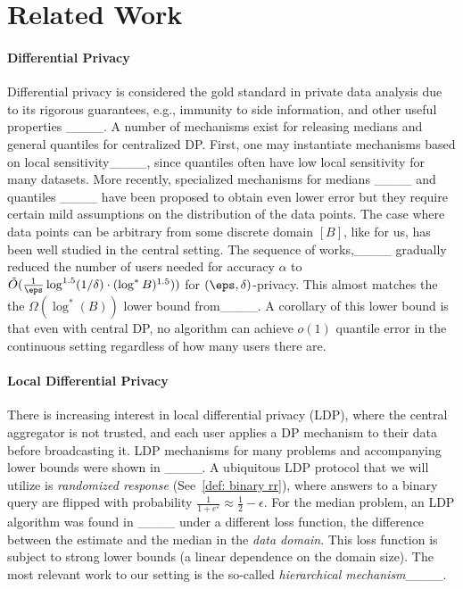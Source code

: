 \section{Related Work}
\label{sec:prior-work}

\paragraph{Differential Privacy} Differential privacy is considered the gold standard in private data analysis due to its rigorous guarantees, e.g., immunity to side information, and other useful properties ____. 
A number of mechanisms exist for releasing medians and general quantiles for centralized DP. First, one may instantiate mechanisms based on local sensitivity____, since quantiles often have low local sensitivity for many datasets. More recently, specialized mechanisms for medians ____ and quantiles ____ have been proposed to obtain even lower error but they require certain mild assumptions on the distribution of the data points.
%
The case where data points can be arbitrary from some discrete domain $[B]$, like for us, has been well studied in the central setting. The sequence of works,____ gradually reduced the number of users needed for accuracy $\alpha$ to $\tilde O(\frac{1}{\eps}\log^{1.5} (1/\delta)\cdot (\log^*B)^{1.5})
)$ for $(\eps,\delta)$-privacy. This almost matches the the $\Omega(\log^*(B))$ lower bound from____. A corollary of this lower bound is that even with central DP, no algorithm can achieve $o(1)$ quantile error in the continuous setting regardless of how many users there are.
%
\paragraph{Local Differential Privacy} There is increasing interest in local differential privacy (LDP), where the central aggregator is not trusted, and each user applies a DP mechanism to their data before broadcasting it. LDP mechanisms for many problems and accompanying lower bounds were shown in ____. A ubiquitous LDP protocol that we will utilize is \emph{randomized response} (See~\cref{def: binary rr}), where answers to a binary query are flipped with probability $\frac{1}{1+e^\varepsilon} \approx \frac{1}{2}-\epsilon$. For the median problem, an LDP algorithm was found in ____ under a different loss function, the difference between the estimate and the median in the \emph{data domain}. This loss function is subject to strong lower bounds (a linear dependence on the domain size). %
The most relevant work to our setting is the so-called \emph{hierarchical mechanism}____.
%

